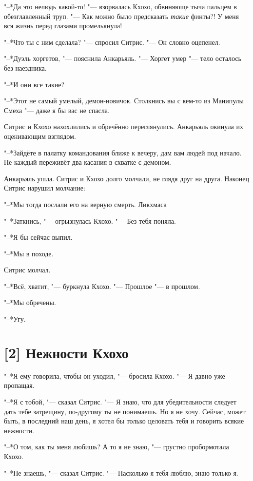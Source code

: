 "--*Да это нелюдь какой-то! "--- взорвалась Кхохо, обвиняюще тыча пальцем в обезглавленный труп.
"--- Как можно было предсказать \emph{такие} финты?!
У меня вся жизнь перед глазами промелькнула!

"--*Что ты с ним сделала? "--- спросил Ситрис.
"--- Он словно оцепенел.

"--*Дуэль хоргетов, "--- пояснила Анкарьяль.
"--- Хоргет умер "--- тело осталось без наездника.

"--*И они все такие?

"--*Этот не самый умелый, демон-новичок.
Столкнись вы с кем-то из Манипулы Смеха "--- даже я бы вас не спасла.

Ситрис и Кхохо нахохлились и обречённо переглянулись.
Анкарьяль окинула их оценивающим взглядом.

"--*Зайдёте в палатку командования ближе к вечеру, дам вам людей под начало.
Не каждый переживёт два касания в схватке с демоном.

Анкарьяль ушла.
Ситрис и Кхохо долго молчали, не глядя друг на друга.
Наконец Ситрис нарушил молчание:

"--*Мы тогда послали его на верную смерть.
Ликхмаса\ldotst

"--*Заткнись, "--- огрызнулась Кхохо.
"--- Без тебя поняла.

"--*Я бы сейчас выпил.

"--*Мы в походе.

Ситрис молчал.

"--*Всё, хватит, "--- буркнула Кхохо.
"--- Прошлое "--- в прошлом.

"--*Мы обречены.

"--*Угу.

\section{[2] Нежности Кхохо}

"--*Я ему говорила, чтобы он уходил, "--- бросила Кхохо.
"--- Я давно уже пропащая.

"--*Я с тобой, "--- сказал Ситрис.
"--- Я знаю, что для убедительности следует дать тебе затрещину, по-другому ты не понимаешь.
Но я не хочу.
Сейчас, может быть, в последний наш день, я хотел бы только целовать тебя и говорить всякие нежности.

"--*О том, как ты меня любишь?
А то я не знаю, "--- грустно пробормотала Кхохо.

"--*Не знаешь, "--- сказал Ситрис.
"--- Насколько я тебя люблю, знаю только я.

